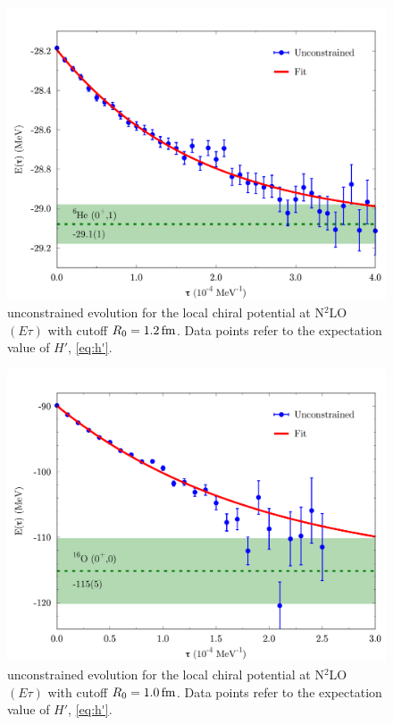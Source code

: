 \documentclass[aps,prc,twocolumn,superscriptaddress,floatfix]{revtex4-1}
\begin{document}
\begin{figure}[htb]
\includegraphics[width=\linewidth]{tr_he6.pdf}
\caption[]{ unconstrained evolution for the local chiral potential at
N$^2$LO $(E\tau)$ with cutoff $R_0=1.2\,\rm fm$. Data points refer to the expectation 
value of $H'$, \cref{eq:h'}.}
\label{fig:tr_he6}
\end{figure}

\begin{figure}[htb]
\includegraphics[width=\linewidth]{tr_o16.pdf}
\caption[]{ unconstrained evolution for the local chiral potential at
N$^2$LO $(E\tau)$ with cutoff $R_0=1.0\,\rm fm$. Data points refer to the expectation 
value of $H'$, \cref{eq:h'}.}
\label{fig:tr_o16}
\end{figure}
\end{document}
